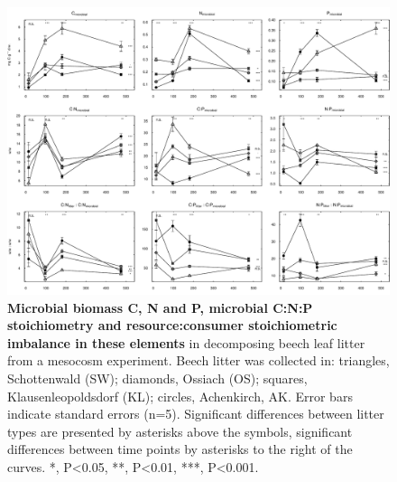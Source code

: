 \documentclass[10pt]{article}
\begin{document}
\begin{flushleft}
\begin{figure}[!ht]
\begin{center}
\includegraphics{ligpaper-mb}
\end{center}
\caption{
{\bf Microbial biomass C, N and P, microbial C:N:P stoichiometry and resource:consumer stoichiometric imbalance in these elements} in decomposing beech leaf litter from a mesocosm experiment. Beech litter was collected in: triangles, Schottenwald (SW); diamonds, Ossiach (OS); squares, Klausenleopoldsdorf (KL); circles, Achenkirch, AK. Error bars indicate standard errors (n=5). Significant differences between litter types are presented by asterisks above the symbols, significant differences between time points by asterisks to the right of the curves. *, P\textless 0.05, **, P\textless 0.01, ***, P\textless 0.001.}
\end{figure}


\end{flushleft}
\end{document}
